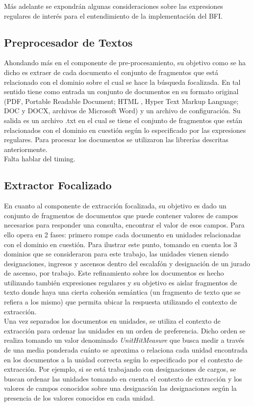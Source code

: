 Más adelante se expondrán algunas consideraciones sobre las expresiones regulares de interés para el entendimiento de la implementación del BFI. \\

\subsection{Preprocesador de Textos}\label{sect:implementacion-preProcesador}

Ahondando más en el componente de pre-procesamiento, su objetivo como se ha dicho es extraer de cada documento el conjunto de fragmentos que está relacionado con el dominio sobre el cual se hace la búsqueda focalizada. En tal sentido tiene como entrada un conjunto de documentos en su formato original (PDF, Portable Readable Document; HTML , Hyper Text Markup Language; DOC y DOCX, archivos de Microsoft Word) y un archivo de configuración. Su salida es un archivo .txt en el cual se tiene el conjunto de fragmentos que están relacionados con el dominio en cuestión según lo especificado por las expresiones regulares. Para procesar los documentos se utilizaron las librerías descritas anteriormente. \\

Falta hablar del timing.

\subsection{Extractor Focalizado}\label{sect:implementacion-extractorFocalizado}

En cuanto al componente de extracción focalizada, su objetivo es dado un conjunto de fragmentos de documentos que puede contener valores de campos necesarios para responder una consulta, encontrar el valor de esos campos. Para ello opera en 2 fases: primero rompe cada documento en unidades relacionadas con el dominio en cuestión. Para ilustrar este punto, tomando en cuenta los 3 dominios que se consideraron para este trabajo, las unidades vienen siendo designaciones, ingresos y ascensos dentro del escalafón y designación de un jurado de ascenso, por trabajo. Este refinamiento sobre los documentos es hecho utilizando también expresiones regulares y su objetivo es aislar fragmentos de texto donde haya una cierta cohesión semántica (un fragmento de texto que se refiera a los mismo) que permita ubicar la respuesta utilizando el contexto de extracción. \\

Una vez separados los documentos en unidades, se utiliza el contexto de extracción para ordenar las unidades en un orden de preferencia. Dicho orden se realiza tomando un valor denominado \emph{UnitHitMeasure} que busca medir a través de una media ponderada cuánto se aproxima o relaciona cada unidad encontrada en los documentos a la unidad correcta según lo especificado por el contexto de extracción. Por ejemplo, si se está trabajando con designaciones de cargos, se buscan ordenar las unidades tomando en cuenta el contexto de extracción y los valores de campos conocidos sobre una designación las designaciones según la presencia de los valores conocidos en cada unidad.\\

